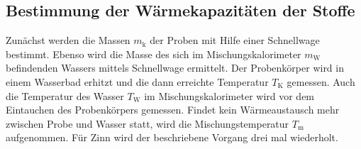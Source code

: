 \subsection{Bestimmung der Wärmekapazitäten der Stoffe}
Zunächst werden die Massen $m_\mathrm{k}$ der Proben mit Hilfe einer Schnellwage bestimmt. Ebenso wird die Masse des sich im Mischungskalorimeter $m_\mathrm{W}$ befindenden Wassers mittels Schnellwage ermittelt.
Der Probenkörper wird in einem Wasserbad erhitzt und die dann erreichte Temperatur $T_\mathrm{K}$ gemessen. Auch die Temperatur des Wasser $T_\mathrm{W}$ im Mischungskalorimeter wird vor dem Eintauchen des Probenkörpers gemessen. Findet kein Wärmeaustausch mehr zwischen Probe und Wasser statt, wird die Mischungstemperatur $T_\mathrm{m}$ aufgenommen.
Für Zinn wird der beschriebene Vorgang drei mal wiederholt.
